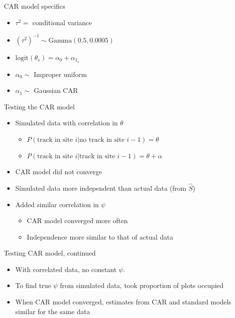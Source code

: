 \documentclass{beamer}
\begin{document}
\begin{frame}{CAR model specifics}
	\begin{itemize}
		\item $\tau^2 =$ conditional variance
		\item $(\tau^2)^{-1} \sim \text{Gamma}(0.5,0.0005)$
		\item $\text{logit}(\theta_s)=\alpha_0+\alpha_{1_s}$
		\item $\alpha_0 \sim$ Improper uniform
		\item $\alpha_1 \sim$ Gaussian CAR
	\end{itemize}
\end{frame}

\begin{frame}{Testing the CAR model}
	\begin{itemize}
		\item Simulated data with correlation in $\theta$
		\begin{itemize} 
			\item $P(\text{track in site }i|\text{no track in site }i-1)=\theta$
			\item $P(\text{track in site }i|\text{track in site }i-1)=\theta+
			\alpha$
		\end{itemize}
		\item CAR model did not converge
		\item Simulated data more independent than actual data (from $\hat{S}$)
		\item Added similar correlation in $\psi$
		\begin{itemize}
			\item CAR model converged more often
			\item Independence more similar to that of actual data
		\end{itemize}
	\end{itemize}
\end{frame}

\begin{frame}{Testing CAR model, continued}
	\begin{itemize}
		\item With correlated data, no constant $\psi$.
		\item To find true $\psi$ from simulated data, took proportion of plots 
		occupied
		\item When CAR model converged, estimates from CAR and standard models 
		similar for the same data
	\end{itemize}
\end{frame}
		 
\end{document}
